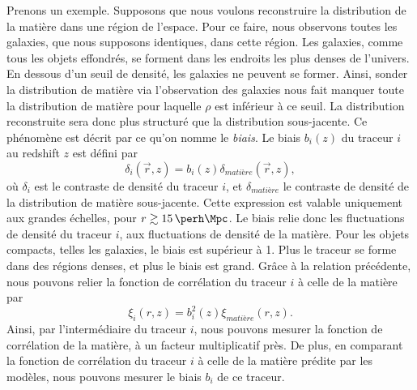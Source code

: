 \documentclass[11pt, twoside, a4paper, openright]{report}
\begin{document}
Prenons un exemple. Supposons que nous voulons reconstruire la distribution de la matière dans une région de l'espace. Pour ce faire, nous observons toutes les galaxies, que nous supposons identiques, dans cette région.
Les galaxies, comme tous les objets effondrés, se forment dans les endroits les plus denses de l'univers.
En dessous d'un seuil de densité, les galaxies ne peuvent se former.
Ainsi, sonder la distribution de matière via l'observation des galaxies nous fait manquer toute la distribution de matière pour laquelle $\rho$ est inférieur à ce seuil.
La distribution reconstruite sera donc plus structuré que la distribution sous-jacente. Ce phénomène est décrit par ce qu'on nomme le \emph{biais}. Le biais $b_i(z)$ du traceur $i$ au redshift $z$ est défini par
\begin{equation}
  \label{eq:biais1}
  \delta_{i}(\vec r, z) = b_{i}(z) \delta_{matière}(\vec r, z), 
\end{equation}
où $\delta_{i}$ est le contraste de densité du traceur $i$, et $\delta_{matière}$ le contraste de densité de la distribution de matière sous-jacente. Cette expression est valable uniquement aux grandes échelles, pour $r \gtrsim \SI{15}{\perh\Mpc}$. Le biais relie donc les fluctuations de densité du traceur $i$, aux fluctuations de densité de la matière. Pour les objets compacts, telles les galaxies, le biais est supérieur à 1. Plus le traceur se forme dans des régions denses, et plus le biais est grand. Grâce à la relation précédente, nous pouvons relier la fonction de corrélation du traceur $i$ à celle de la matière par
\begin{equation}
  \label{eq:biais2}
  \xi_{i}(r, z) = b_{i}^2(z) \xi_{matière}(r, z) .
\end{equation}
Ainsi, par l'intermédiaire du traceur $i$, nous pouvons mesurer la fonction de corrélation de la matière, à un facteur multiplicatif près. De plus, en comparant la fonction de corrélation du traceur $i$ à celle de la matière prédite par les modèles, nous pouvons mesurer le biais $b_{i}$ de ce traceur. 
\end{document}
